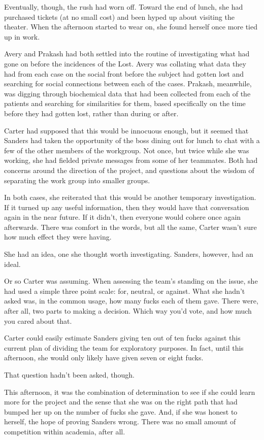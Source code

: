 Eventually, though, the rush had worn off. Toward the end of lunch, she had purchased tickets (at no small cost) and been hyped up about visiting the theater. When the afternoon started to wear on, she found herself once more tied up in work.

Avery and Prakash had both settled into the routine of investigating what had gone on before the incidences of the Lost. Avery was collating what data they had from each case on the social front before the subject had gotten lost and searching for social connections between each of the cases. Prakash, meanwhile, was digging through biochemical data that had been collected from each of the patients and searching for similarities for them, based specifically on the time before they had gotten lost, rather than during or after.

Carter had supposed that this would be innocuous enough, but it seemed that Sanders had taken the opportunity of the boss dining out for lunch to chat with a few of the other members of the workgroup. Not once, but twice while she was working, she had fielded private messages from some of her teammates. Both had concerns around the direction of the project, and questions about the wisdom of separating the work group into smaller groups.

In both cases, she reiterated that this would be another temporary investigation. If it turned up any useful information, then they would have that conversation again in the near future. If it didn't, then everyone would cohere once again afterwards. There was comfort in the words, but all the same, Carter wasn't sure how much effect they were having.

She had an idea, one she thought worth investigating. Sanders, however, had an ideal.

Or so Carter was assuming. When assessing the team's standing on the issue, she had used a simple three point scale: for, neutral, or against. What she hadn't asked was, in the common usage, how many fucks each of them gave. There were, after all, two parts to making a decision. Which way you'd vote, and how much you cared about that.

Carter could easily estimate Sanders giving ten out of ten fucks against this current plan of dividing the team for exploratory purposes. In fact, until this afternoon, she would only likely have given seven or eight fucks.

That question hadn't been asked, though.

This afternoon, it was the combination of determination to see if she could learn more for the project and the sense that she was on the right path that had bumped her up on the number of fucks she gave. And, if she was honest to herself, the hope of proving Sanders wrong. There was no small amount of competition within academia, after all.

